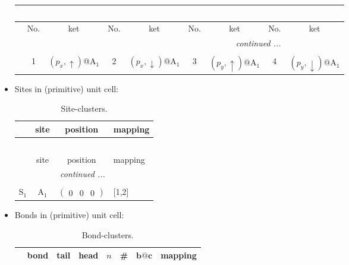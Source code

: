 \documentclass[fleqn,10pt,landscape]{article}
\begin{document}
\begin{itemize}
\begin{center}
\begin{longtable}{c|cc|cc|cc|cc}
\multicolumn{8}{l}{\tablename\ \thetable{}} \\
 \hline \hline
 & No. & ket & No. & ket & No. & ket & No. & ket \\ \hline \endhead

 \hline \hline
\multicolumn{8}{r}{\footnotesize\it continued ...} \\ \endfoot

 \hline \hline
\multicolumn{8}{r}{} \\ \endlastfoot

 & 1 & $(p_{x},\uparrow)$@A$_{1}$ & 2 & $(p_{x},\downarrow)$@A$_{1}$ & 3 & $(p_{y},\uparrow)$@A$_{1}$ & 4 & $(p_{y},\downarrow)$@A$_{1}$ \\
\end{longtable}
\end{center}

\item Sites in (primitive) unit cell:
\begin{center}
\renewcommand{\arraystretch}{1.3}
\begin{longtable}{cc|c|l}
\caption{Site-clusters.}
 \\
 \hline \hline
 & site & position & mapping \\ \hline \endfirsthead

\multicolumn{3}{l}{\tablename\ \thetable{}} \\
 \hline \hline
 & site & position & mapping \\ \hline \endhead

 \hline \hline
\multicolumn{3}{r}{\footnotesize\it continued ...} \\ \endfoot

 \hline \hline
\multicolumn{3}{r}{} \\ \endlastfoot

S$_{1}$ & A$_1$ & $\begin{pmatrix} 0 & 0 & 0 \end{pmatrix}$ & [1,2] \\
\end{longtable}
\end{center}

\item Bonds in (primitive) unit cell:
\begin{center}
\renewcommand{\arraystretch}{1.3}
\begin{longtable}{cc|cc|c|c|c|l}
\caption{Bond-clusters.}
 \\
 \hline \hline
 & bond & tail & head & $n$ & \# & $\bm{b}@\bm{c}$ & mapping \\ \hline \endfirsthead


\end{longtable}
\end{center}
\end{itemize}
\end{document}
